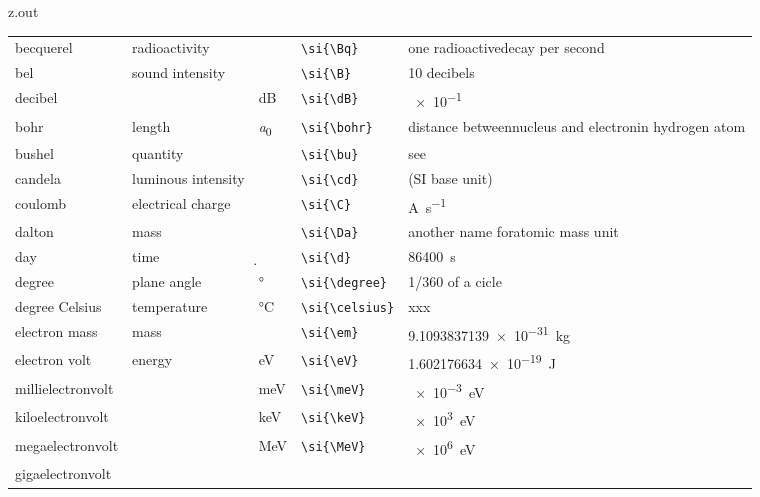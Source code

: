 \begin{VerbatimOut}{z.out}
{\begin{longtable}{@{}P{1.4in}P{1in}llP{1.8in}@{}}
    \vsp
    becquerel&
      radioactivity&
      \si{\Bq}&
      \verb+\si{\Bq}+&
      one radioactive\newline decay per second\\
    \vsp
    bel&
      sound intensity&
      \si{\B}&
      \verb+\si{\B}+&
      10 decibels\\
    \quad decibel&
      \ditto&
      \si{\dB}&
      \verb+\si{\dB}+&
      \SI{e-1}{\B}\\
    \vsp
    bohr&
      length&
      \si{\bohr}&
      \verb+\si{\bohr}+&
      distance between\newline nucleus and electron\newline in hydrogen atom\\
    \vsp
    bushel&
      quantity&
      \si{\bu}&
      \verb+\si{\bu}+&
      see \cite{wikipedia-bushel}\\
    \vsp
    candela&
      luminous intensity&
      \si{\cd}&
      \verb+\si{\cd}+&
      (SI base unit)\\
    \vsp
    coulomb&
      electrical charge&
      \si{\C}&
      \verb+\si{\C}+&
      \si{\A\per\s}\\
    \vsp
    dalton&
      mass&
      \si{\Da}&
      \verb+\si{\Da}+&
      another name for\newline atomic mass unit\\
    \vsp
    day&
      time&
      \si{\d}&
      \verb+\si{\d}+&
      \SI{86400}{\s}\\
    \vsp
    degree&
      plane angle&
      \si{\degree}&
      \verb+\si{\degree}+&
      1/360 of a cicle\\
    \vsp
    degree Celsius&
      temperature&
      \si{\celsius}&
      \verb+\si{\celsius}+&
      xxx\\
    \vsp
    electron mass&
      mass&
      \si{\em}&
      \verb+\si{\em}+&
      \SI{9.1093837139e-31}{\kg}\\
    \vsp
    electron volt&
      energy&
      \si{\eV}&
      \verb+\si{\eV}+&
      \SI{1.602176634e-19}{\joule}\\
    \quad millielectronvolt&
      \ditto&
      \si{\meV}&
      \verb+\si{\meV}+&
      \SI{e-3}{\eV}\\
    \quad kiloelectronvolt&
      \ditto&
      \si{\keV}&
      \verb+\si{\keV}+&
      \SI{e3}{\eV}\\
    \quad megaelectronvolt&
      \ditto&
      \si{\MeV}&
      \verb+\si{\MeV}+&
      \SI{e6}{\eV}\\
    \quad gigaelectronvolt&

\end{longtable}}
\end{VerbatimOut}
